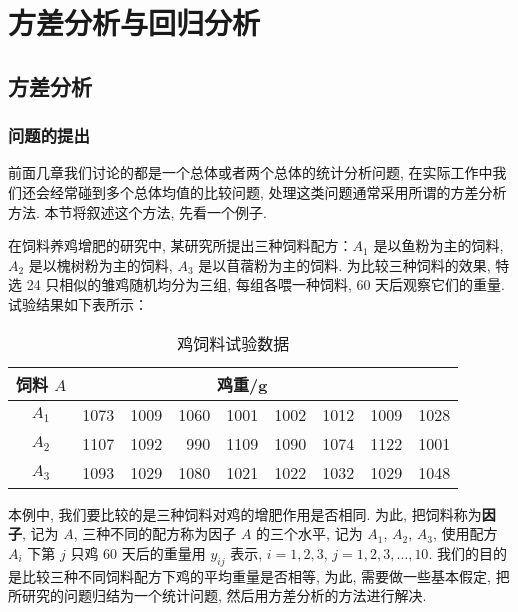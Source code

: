 \chapter{方差分析与回归分析}\label{cha:8}

\section{方差分析}\label{sec:8.1}
\subsection{问题的提出}
前面几章我们讨论的都是一个总体或者两个总体的统计分析问题, 在实际工作中我们还会经常碰到多个总体均值的比较问题, 处理这类问题通常采用所谓的方差分析方法. 本节将叙述这个方法, 先看一个例子. 

\begin{example}\label{exam:8.1.1}
在饲料养鸡增肥的研究中, 某研究所提出三种饲料配方：$A_1$ 是以鱼粉为主的饲料, $A_2$ 是以槐树粉为主的饲料, $A_3$ 是以苜蓿粉为主的饲料. 为比较三种饲料的效果, 特选 24 只相似的雏鸡随机均分为三组, 每组各喂一种饲料, 60 天后观察它们的重量. 试验结果如下表所示：

\begin{table}[htbp]
  \centering
  \caption{鸡饲料试验数据}
    \begin{tabular}{c|rrrrrrrr}
    \toprule
    饲料 $A$   & \multicolumn{7}{c}{鸡重/\si{\gram}                     } &      \\
    \midrule
    $A_1$  & 1073  & 1009  & 1060  & 1001  & 1002  & 1012  & 1009  & 1028 \\
    $A_2$  & 1107  & 1092  & 990   & 1109  & 1090  & 1074  & 1122  & 1001 \\
    $A_3$  & 1093  & 1029  & 1080  & 1021  & 1022  & 1032  & 1029  & 1048 \\
    \bottomrule
    \end{tabular}%
  \label{tab:8.1.1}%
\end{table}%
\end{example}

本例中, 我们要比较的是三种饲料对鸡的增肥作用是否相同. 为此, 把饲料称为\textbf{因子}, 记为 $A$, 三种不同的配方称为因子 $A$ 的三个水平, 记为 $A_1$, $A_2$, $A_3$, 使用配方 $A_i$ 下第 $j$ 只鸡 60 天后的重量用 $y_{ij}$ 表示, $i = 1,2,3$, $j =1,2,3,\ldots,10$. 我们的目的是比较三种不同饲料配方下鸡的平均重量是否相等, 为此, 需要做一些基本假定, 把所研究的问题归结为一个统计问题, 然后用方差分析的方法进行解决. 

